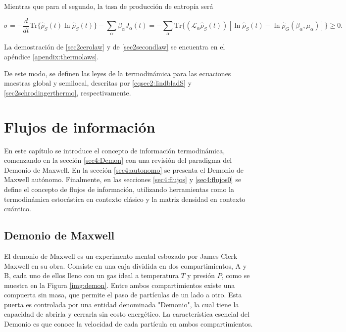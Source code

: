 Mientras que para el segundo, la tasa de producción de entropía será 

\begin{equation}
    \dot{\sigma} = - \frac{d}{dt}\text{Tr}\{\hat{\rho}_{S}(t) \ln \hat{\rho}_{S}(t) \} - \sum_{\alpha} \beta_{\alpha} J_{\alpha}(t) = -\sum_{\alpha} \text{Tr}\{(\mathcal{L}_{\alpha}\hat{\rho}_{S}(t))[\ln \hat{\rho}_{S}(t) - \ln \hat{\rho}_{G}(\beta_{\alpha},\mu_{\alpha})] \} \geq 0.
\label{sec2secondlaw}
\end{equation}

La demostración de \ref{sec2cerolaw} y de \ref{sec2secondlaw} se encuentra en el apéndice \ref{apendix:thermolaws}. 

De este modo, se definen las leyes de la termodinámica para las ecuaciones maestras global y semilocal, descritas por \ref{eqsec2:lindbladS} y \ref{sec2schrodingerthermo}, respectivamente.



\chapter{Flujos de información}
En este capítulo se introduce el concepto de información termodinámica, comenzando en la sección \ref{sec4:Demon} con una revisión del paradigma del Demonio de Maxwell. En la sección \ref{sec4:autonomo} se presenta el Demonio de Maxwell autónomo. Finalmente, en las secciones \ref{sec4:flujos} y \ref{sec4:flujos0} se define el concepto de flujos de información, utilizando herramientas como la termodinámica estocástica en contexto clásico y la matriz densidad en contexto cuántico\cite{horowitz2014thermodynamics,ptaszynski2019thermodynamics}.


\section{Demonio de Maxwell}
El demonio de Maxwell es un experimento mental esbozado por James Clerk Maxwell en su obra\cite{Maxwell_1871}. Consiste en una caja dividida en dos compartimientos, A y B, cada uno de ellos lleno con un gas ideal a temperatura $T$ y presión $P$, como se muestra en la Figura \ref{img:demon}. Entre ambos compartimientos existe una compuerta sin masa, que permite el paso de partículas de un lado a otro. Esta puerta es controlada por una entidad denominada "Demonio", la cual tiene la capacidad de abrirla y cerrarla sin costo energético. La característica esencial del Demonio es que conoce la velocidad de cada partícula en ambos compartimientos. 

